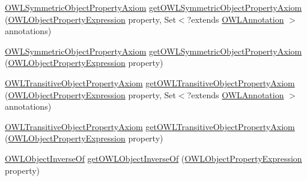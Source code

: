 \begin{DoxyCompactItemize}
\item 
\hyperlink{interfaceorg_1_1semanticweb_1_1owlapi_1_1model_1_1_o_w_l_symmetric_object_property_axiom}{O\-W\-L\-Symmetric\-Object\-Property\-Axiom} \hyperlink{classuk_1_1ac_1_1manchester_1_1cs_1_1owl_1_1owlapi_1_1_o_w_l_data_factory_impl_a70f4e902b12e253a6d014f3662e68540}{get\-O\-W\-L\-Symmetric\-Object\-Property\-Axiom} (\hyperlink{interfaceorg_1_1semanticweb_1_1owlapi_1_1model_1_1_o_w_l_object_property_expression}{O\-W\-L\-Object\-Property\-Expression} property, Set$<$?extends \hyperlink{interfaceorg_1_1semanticweb_1_1owlapi_1_1model_1_1_o_w_l_annotation}{O\-W\-L\-Annotation} $>$ annotations)
\item 
\hyperlink{interfaceorg_1_1semanticweb_1_1owlapi_1_1model_1_1_o_w_l_symmetric_object_property_axiom}{O\-W\-L\-Symmetric\-Object\-Property\-Axiom} \hyperlink{classuk_1_1ac_1_1manchester_1_1cs_1_1owl_1_1owlapi_1_1_o_w_l_data_factory_impl_a1f3cc68046b2869887a7acba3a21d51d}{get\-O\-W\-L\-Symmetric\-Object\-Property\-Axiom} (\hyperlink{interfaceorg_1_1semanticweb_1_1owlapi_1_1model_1_1_o_w_l_object_property_expression}{O\-W\-L\-Object\-Property\-Expression} property)
\item 
\hyperlink{interfaceorg_1_1semanticweb_1_1owlapi_1_1model_1_1_o_w_l_transitive_object_property_axiom}{O\-W\-L\-Transitive\-Object\-Property\-Axiom} \hyperlink{classuk_1_1ac_1_1manchester_1_1cs_1_1owl_1_1owlapi_1_1_o_w_l_data_factory_impl_ad8b6ceaa51cdced700ad640cc4eb1621}{get\-O\-W\-L\-Transitive\-Object\-Property\-Axiom} (\hyperlink{interfaceorg_1_1semanticweb_1_1owlapi_1_1model_1_1_o_w_l_object_property_expression}{O\-W\-L\-Object\-Property\-Expression} property, Set$<$?extends \hyperlink{interfaceorg_1_1semanticweb_1_1owlapi_1_1model_1_1_o_w_l_annotation}{O\-W\-L\-Annotation} $>$ annotations)
\item 
\hyperlink{interfaceorg_1_1semanticweb_1_1owlapi_1_1model_1_1_o_w_l_transitive_object_property_axiom}{O\-W\-L\-Transitive\-Object\-Property\-Axiom} \hyperlink{classuk_1_1ac_1_1manchester_1_1cs_1_1owl_1_1owlapi_1_1_o_w_l_data_factory_impl_a6067cd0210edd7256fbdd33f496a5dfc}{get\-O\-W\-L\-Transitive\-Object\-Property\-Axiom} (\hyperlink{interfaceorg_1_1semanticweb_1_1owlapi_1_1model_1_1_o_w_l_object_property_expression}{O\-W\-L\-Object\-Property\-Expression} property)
\item 
\hyperlink{interfaceorg_1_1semanticweb_1_1owlapi_1_1model_1_1_o_w_l_object_inverse_of}{O\-W\-L\-Object\-Inverse\-Of} \hyperlink{classuk_1_1ac_1_1manchester_1_1cs_1_1owl_1_1owlapi_1_1_o_w_l_data_factory_impl_a68213cb80dd954a5a0d1d1d1d049cedf}{get\-O\-W\-L\-Object\-Inverse\-Of} (\hyperlink{interfaceorg_1_1semanticweb_1_1owlapi_1_1model_1_1_o_w_l_object_property_expression}{O\-W\-L\-Object\-Property\-Expression} property)

\end{DoxyCompactItemize}
